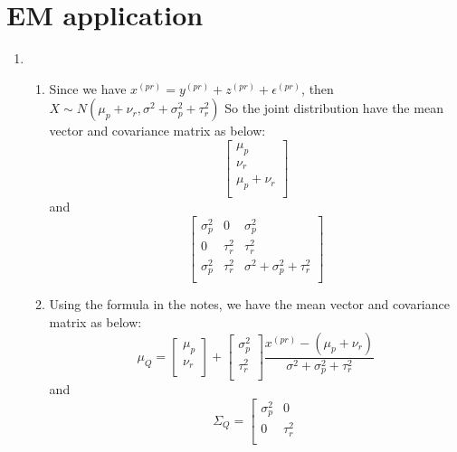 \documentclass[12pt]{article}
\begin{document}
    \section*{EM application}
    \begin{enumerate}[label=(\alph*)]
        \item \begin{enumerate}[label=(\roman*)]
            \item Since we have $x^{(pr)} = y^{(pr)} + z^{(pr)} + \epsilon^{(pr)}$, then $X\sim N(\mu_p+\nu_r,\sigma^2+\sigma_p^2+\tau_r^2)$
            So the joint distribution have the mean vector and covariance matrix as below:
            $$
            \left[\begin{matrix}
                \mu_p \\
                \nu_r \\
                \mu_p+\nu_r \\
            \end{matrix}\right]
            $$ 
            and
            $$
            \left[\begin{matrix}
                \sigma_p^2  & 0 & \sigma_p^2 \\
                0 & \tau_r^2 & \tau_r^2 \\
                \sigma_p^2 & \tau_r^2 & \sigma^2+\sigma_p^2+\tau_r^2\\
            \end{matrix}\right]
            $$ 
            \item Using the formula in the notes, we have the mean vector and covariance matrix as below:
            $$
            \mu_Q = 
            \left[\begin{matrix}
                \mu_p \\
                \nu_r \\
            \end{matrix}\right]
            +
            \left[\begin{matrix}
                \sigma_p^2 \\
                \tau_r^2 \\
            \end{matrix}\right]\frac{x^{(pr)}-(\mu_p+\nu_r)}{\sigma^2+\sigma_p^2+\tau_r^2}
            $$ 
            and
            $$
            \Sigma_Q = 
            \left[\begin{matrix}
                \sigma_p^2  & 0  \\
                0 & \tau_r^2 \\

\end{matrix}$$
\end{enumerate}
\end{enumerate}
\end{document}
